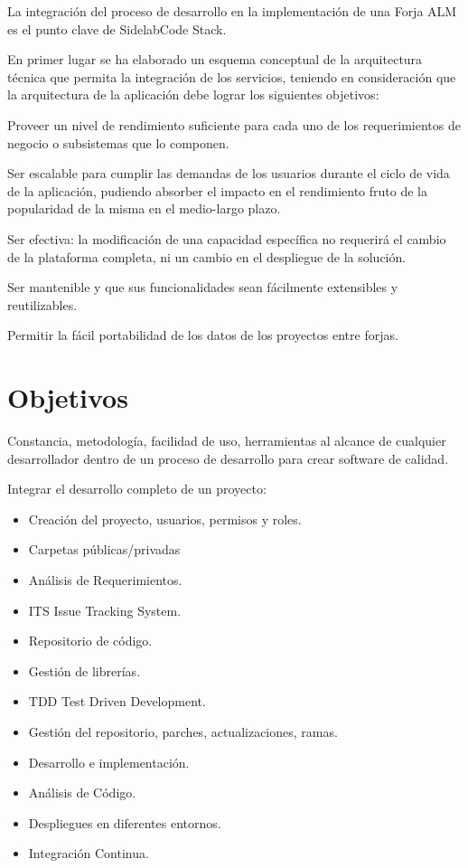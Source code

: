 \documentclass[11pt]{scrartcl}
\begin{document}
\par La integración del proceso de desarrollo en la implementación de una Forja ALM es el punto clave de SidelabCode Stack.

En primer lugar se ha elaborado un esquema conceptual de la arquitectura técnica que
permita la integración de los servicios, teniendo en consideración que la arquitectura de la
aplicación debe lograr los siguientes objetivos:

Proveer un nivel de rendimiento suficiente para cada uno de los requerimientos de
   negocio o subsistemas que lo componen.

Ser escalable para cumplir las demandas de los usuarios durante el ciclo de vida de la
   aplicación, pudiendo absorber el impacto en el rendimiento fruto de la popularidad de la
   misma en el medio-largo plazo.

Ser efectiva: la modificación de una capacidad específica no requerirá el cambio de la
      plataforma completa, ni un cambio en el despliegue de la solución.

Ser mantenible y que sus funcionalidades sean fácilmente extensibles y reutilizables.

Permitir la fácil portabilidad de los datos de los proyectos entre forjas.


\section{Objetivos}
\label{sec:objetivos}

\par Constancia, metodolog\'ia, facilidad de uso, herramientas al alcance de cualquier desarrollador dentro de un proceso de desarrollo para crear software de calidad.

\par Integrar el desarrollo completo de un proyecto:

\begin{itemize}
	\item Creación del proyecto, usuarios, permisos y roles.
	\item Carpetas públicas/privadas
	\item Análisis de Requerimientos.
	\item ITS Issue Tracking System.
	\item Repositorio de código.
	\item Gestión de librerías.
	\item TDD Test Driven Development.
	\item Gestión del repositorio, parches, actualizaciones, ramas.
	\item Desarrollo e implementación.
	\item Análisis de Código.
	\item Despliegues en diferentes entornos.
	\item Integración Continua.
\end{itemize}
\end{document}

